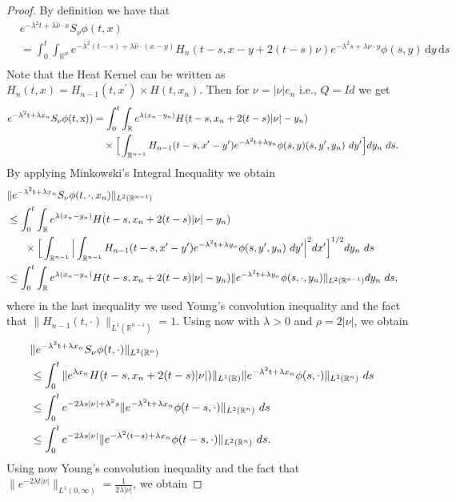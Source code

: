 \documentclass[10pt,a4paper]{amsart}
\theoremstyle{remark}
\theoremstyle{definition}
\newcommand{\R}{\mathbb{R}}
\newcommand{\dd}{\mathrm{d}}
\newcommand{\tm}{\mathrm{t}}
\newcommand{\x}{\mathrm{x}}
\begin{document}
\iffalse
\begin{proof}
By definition we have that
\begin{align*}
&     e^{-\lambda^2 t + \lambda \hat{\nu} \cdot x} S_\nu \phi(t,x) \\
          &= \int_0^t \int_{\R^n} e^{-\lambda^2 (t - s) + \lambda \hat{\nu} \cdot (x - y)} H_n(t-s,x-y + 2(t-s){\nu}) e^{-\lambda^2 s + \lambda \hat{\nu} \cdot y}\phi(s, y) \,\dd y \,\dd s\\
\end{align*}
Note that the Heat Kernel can be written as $H_n(t,x)=H_{n-1}(t,x^\prime) \times H(t,x_n)$. 
Then for {${\nu}=|{\nu}| e_n$} i.e., $Q=Id$ we get
\begin{align*}
    e^{-\lambda^2 \tm + \lambda x_n} S_\nu \phi(t,\x))&= \int_0^t \int_{\R} e^{\lambda (x_n-y_n)}H(t-s,x_n+2(t-s)|{\nu}|-y_n) \cr &\quad\times\Big[\int_{\R^{n-1}} H_{n-1}(t-s,x^\prime-y^\prime) e^{-\lambda^2 \tm + \lambda y_n}\phi(s, y)(s, y^\prime, y_n) ~dy^\prime \Big] dy_n ~ds.
\end{align*}
By applying Minkowski's Integral Inequality we obtain
\begin{align*}
   & \|e^{-\lambda^2 \tm + \lambda x_n} S_\nu \phi(t,\cdot,x_n)\|_{L^2(\R^{n-1})}\cr
    &\leq \int_0^t \int_{\R} e^{\lambda (x_n-y_n)}  H(t-s,x_n+2(t-s)|{\nu}|-y_n)\cr &~~~~~\times\Big[  \int_{\R^{n-1}} \Big| \int_{\R^{n-1}} H_{n-1}(t-s,x^\prime-y^\prime) e^{-\lambda^2 \tm + \lambda y_n}\phi(s, y^\prime, y_n) ~dy^\prime  \Big|^2 dx^\prime  \Big]^{1/2} dy_n ~ds\cr
    &\leq \int_0^t \int_{\R} e^{\lambda (x_n-y_n)}  H(t-s,x_n+2(t-s)|{\nu}|-y_n)\|e^{-\lambda^2 \tm + \lambda y_n}\phi(s, \cdot, y_n)\|_{L^2(\R^{n-1})}  dy_n ~ds,
\end{align*}
where in the last inequality we used Young's convolution inequality and the fact that $\|H_{n-1}(t, \cdot)\|_{L^1(\R^{n-1})}=1$. 
Using now  with $\lambda > 0$ and $\rho = 2 |\nu|$, we obtain
\begin{align*}
   & \|e^{-\lambda^2 \tm + \lambda x_n} S_\nu \phi(t,\cdot)\|_{L^2(\R^{n})}\cr
    &\leq \int_0^t \|e^{\lambda x_n}  H(t-s,x_n+2(t-s)|{\nu}|)\|_{L^1(\R)}\|e^{-\lambda^2 \tm + \lambda x_n}\phi(s, \cdot)\|_{L^2(\R^{n})}   ~ds\cr
        &\leq \int_0^t  e^{-2\lambda s |\nu|+\lambda^2 s} \|e^{-\lambda^2 \tm + \lambda x_n}\phi(t-s, \cdot)\|_{L^2(\R^{n})}   ~ds\cr
        &\leq \int_{0}^t  e^{-2\lambda s |\nu|} \|e^{-\lambda^2 (\tm-s) + \lambda x_n}\phi(t-s, \cdot)\|_{L^2(\R^{n})}   ~ds.
\end{align*}
Using now Young's convolution inequality and the fact that $\|e^{-2\lambda t |\nu|}\|_{L^1(0,\infty)}=\frac{1}{2\lambda  |\nu|}$, we obtain 

\end{proof}
\end{document}
